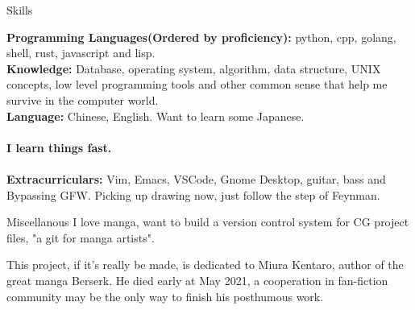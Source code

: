 \documentclass{resume} %
\begin{document}

\begin{rSection}{Skills}

{\bf Programming Languages(Ordered by proficiency):} python, cpp, golang, shell, rust, javascript and lisp.
\\ {\bf Knowledge:} Database, operating system, algorithm, data structure, UNIX concepts, low level programming tools and other common sense that help me survive in the computer world.
\\ {\bf Language:} Chinese, English. Want to learn some Japanese.
\\
\\ {\bf I learn things fast.}
\\
\\ {\bf Extracurriculars:} Vim, Emacs, VSCode, Gnome Desktop, guitar, bass and Bypassing GFW. Picking up drawing now, just follow the step of Feynman.

\end{rSection}


\begin{rSection}{Miscellanous} 
I love manga, want to build a version control system for CG project files, "a git for manga artists".

This project, if it's really be made, is dedicated to Miura Kentaro, author of the great manga Berserk. He died early at May 2021, a cooperation in fan-fiction community may be the only way to finish his posthumous work.

\end{rSection}
\end{document}
